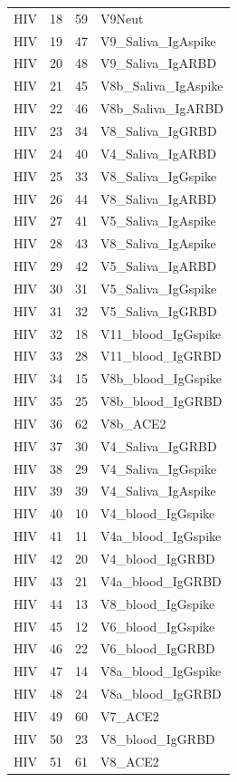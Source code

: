 \begin{longtable}{lrrp{}}
HIV & 18 & 59 & V9Neut \\
HIV & 19 & 47 & V9\_Saliva\_IgAspike \\
HIV & 20 & 48 & V9\_Saliva\_IgARBD \\
HIV & 21 & 45 & V8b\_Saliva\_IgAspike \\
HIV & 22 & 46 & V8b\_Saliva\_IgARBD \\
HIV & 23 & 34 & V8\_Saliva\_IgGRBD \\
HIV & 24 & 40 & V4\_Saliva\_IgARBD \\
HIV & 25 & 33 & V8\_Saliva\_IgGspike \\
HIV & 26 & 44 & V8\_Saliva\_IgARBD \\
HIV & 27 & 41 & V5\_Saliva\_IgAspike \\
HIV & 28 & 43 & V8\_Saliva\_IgAspike \\
HIV & 29 & 42 & V5\_Saliva\_IgARBD \\
HIV & 30 & 31 & V5\_Saliva\_IgGspike \\
HIV & 31 & 32 & V5\_Saliva\_IgGRBD \\
HIV & 32 & 18 & V11\_blood\_IgGspike \\
HIV & 33 & 28 & V11\_blood\_IgGRBD \\
HIV & 34 & 15 & V8b\_blood\_IgGspike \\
HIV & 35 & 25 & V8b\_blood\_IgGRBD \\
HIV & 36 & 62 & V8b\_ACE2 \\
HIV & 37 & 30 & V4\_Saliva\_IgGRBD \\
HIV & 38 & 29 & V4\_Saliva\_IgGspike \\
HIV & 39 & 39 & V4\_Saliva\_IgAspike \\
HIV & 40 & 10 & V4\_blood\_IgGspike \\
HIV & 41 & 11 & V4a\_blood\_IgGspike \\
HIV & 42 & 20 & V4\_blood\_IgGRBD \\
HIV & 43 & 21 & V4a\_blood\_IgGRBD \\
HIV & 44 & 13 & V8\_blood\_IgGspike \\
HIV & 45 & 12 & V6\_blood\_IgGspike \\
HIV & 46 & 22 & V6\_blood\_IgGRBD \\
HIV & 47 & 14 & V8a\_blood\_IgGspike \\
HIV & 48 & 24 & V8a\_blood\_IgGRBD \\
HIV & 49 & 60 & V7\_ACE2 \\
HIV & 50 & 23 & V8\_blood\_IgGRBD \\
HIV & 51 & 61 & V8\_ACE2 \\

\end{longtable}
